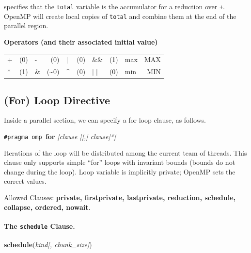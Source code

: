 \documentclass[a4paper]{report}
\begin{document}
\noindent
specifies that the {\tt total} variable is the accumulator for a
reduction over {\tt +}. OpenMP will create local copies of {\tt total} and 
combine them at the end of the parallel region.

{\bf Operators (and their associated initial value)}
  \begin{center}
    \begin{tabular}{l r | l r | l r | l r | l r}
      + & (0) & -  &  (0) &    $\mid$ & (0) & \&\& & (1) & max & MAX\\
      * & (1) & \& & (\~{}0) & \^{} & (0) &   $\mid\mid$ & (0) & min & MIN\\ 
    \end{tabular}
  \end{center}

\subsection*{(For) Loop Directive} Inside a parallel section, we can
specify a for loop clause, as follows.

  \begin{center}
    {\tt \#pragma omp }{\bf for} {\it [clause [[,] clause]*]}
  \end{center}

    Iterations of the loop will be distributed among the
      current team of threads.
    This clause only supports simple ``for'' loops with invariant bounds (bounds do
      not change during the loop).
    Loop variable is implicitly private; OpenMP sets the
      correct values.

  Allowed Clauses: {\bf private, firstprivate, lastprivate, reduction, schedule,
    collapse, ordered, nowait}.

\paragraph{The {\tt schedule} Clause.}

  \begin{center}
    {\bf schedule}({\it kind[, chunk\_size]})
  \end{center}
\end{document}
